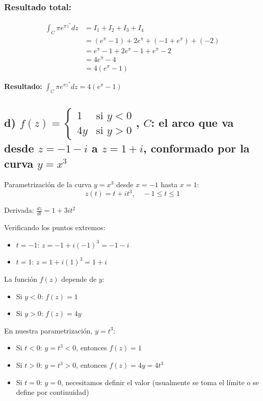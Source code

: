 \documentclass{article}
\begin{document}
\subsubsection*{Resultado total:}

\begin{align*}
\int_C \pi e^{\pi z^*} dz &= I_1 + I_2 + I_3 + I_4 \\
                          &= (e^{\pi} - 1) + 2e^{\pi} + (-1 + e^{\pi}) + (-2) \\
                          &= e^{\pi} - 1 + 2e^{\pi} - 1 + e^{\pi} - 2 \\
                          &= 4e^{\pi} - 4 \\
                          &= 4(e^{\pi} - 1)
\end{align*}

\textbf{Resultado:} $\int_C \pi e^{\pi z^*} dz = 4(e^{\pi} - 1)$

\subsection*{d) $f(z) = \begin{cases} 1 & \text{si } y < 0 \\ 4y & \text{si } y > 0 \end{cases}$, $C$: el arco que va desde $z = -1 - i$ a $z = 1 + i$, conformado por la curva $y = x^3$}

Parametrización de la curva $y = x^3$ desde $x = -1$ hasta $x = 1$:
$$z(t) = t + it^3, \quad -1 \leq t \leq 1$$

Derivada: $\frac{dz}{dt} = 1 + 3it^2$

Verificando los puntos extremos:
\begin{itemize}
\item $t = -1$: $z = -1 + i(-1)^3 = -1 - i$ \checkmark
\item $t = 1$: $z = 1 + i(1)^3 = 1 + i$ \checkmark
\end{itemize}

La función $f(z)$ depende de $y$:
\begin{itemize}
\item Si $y < 0$: $f(z) = 1$
\item Si $y > 0$: $f(z) = 4y$
\end{itemize}

En nuestra parametrización, $y = t^3$:
\begin{itemize}
\item Si $t < 0$: $y = t^3 < 0$, entonces $f(z) = 1$
\item Si $t > 0$: $y = t^3 > 0$, entonces $f(z) = 4y = 4t^3$
\item Si $t = 0$: $y = 0$, necesitamos definir el valor (usualmente se toma el límite o se define por continuidad)
\end{itemize}
\end{document}
